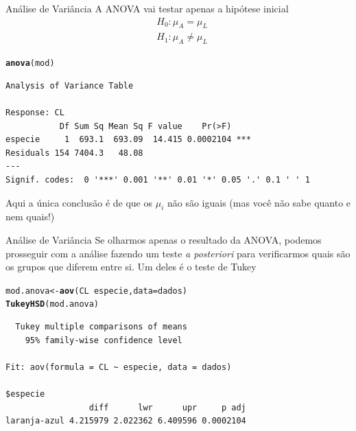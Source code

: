 \documentclass[10pt]{beamer}\usepackage[]{graphicx}\usepackage[]{color}
\makeatletter
\newcommand{\hlopt}[1]{\textcolor[rgb]{0,0,0}{#1}}%
\newcommand{\hlstd}[1]{\textcolor[rgb]{0.345,0.345,0.345}{#1}}%
\newcommand{\hlkwb}[1]{\textcolor[rgb]{0.69,0.353,0.396}{#1}}%
\newcommand{\hlkwc}[1]{\textcolor[rgb]{0.333,0.667,0.333}{#1}}%
\newcommand{\hlkwd}[1]{\textcolor[rgb]{0.737,0.353,0.396}{\textbf{#1}}}%
\newenvironment{kframe}{%
 \def\at@end@of@kframe{}%
 \ifinner\ifhmode%
  \def\at@end@of@kframe{\end{minipage}}%
  \begin{minipage}{\columnwidth}%
 \fi\fi%
 \def\FrameCommand##1{\hskip\@totalleftmargin \hskip-\fboxsep
 \colorbox{shadecolor}{##1}\hskip-\fboxsep
     \hskip-\linewidth \hskip-\@totalleftmargin \hskip\columnwidth}%
 \MakeFramed {\advance\hsize-\width
   \@totalleftmargin\z@ \linewidth\hsize
   \@setminipage}}%
 {\par\unskip\endMakeFramed%
 \at@end@of@kframe}
\newenvironment{knitrout}{}{} %
\theoremstyle{definition}
\makeatother
\begin{document}
\begin{frame}[fragile]{Análise de Variância}
A ANOVA vai testar apenas a hipótese inicial
\begin{align*}
  &H_0: \mu_A = \mu_L \\
  &H_1: \mu_A \neq \mu_L
\end{align*}
\begin{knitrout}\footnotesize
{}\color{fgcolor}\begin{kframe}
\begin{alltt}
\hlkwd{anova}\hlstd{(mod)}
\end{alltt}
\begin{verbatim}
Analysis of Variance Table

Response: CL
           Df Sum Sq Mean Sq F value    Pr(>F)    
especie     1  693.1  693.09  14.415 0.0002104 ***
Residuals 154 7404.3   48.08                      
---
Signif. codes:  0 '***' 0.001 '**' 0.01 '*' 0.05 '.' 0.1 ' ' 1
\end{verbatim}
\end{kframe}
\end{knitrout}
Aqui a única conclusão é de que os $\mu_i$ não são iguais (mas você
não sabe quanto e nem quais!)
\end{frame}

\begin{frame}[fragile]{Análise de Variância}
Se olharmos apenas o resultado da ANOVA, podemos prosseguir com a
análise fazendo um teste \textit{a posteriori} para verificarmos quais
são os grupos que diferem entre si. Um deles é o teste de Tukey
\begin{knitrout}\footnotesize
{}\color{fgcolor}\begin{kframe}
\begin{alltt}
\hlstd{mod.anova} \hlkwb{<-} \hlkwd{aov}\hlstd{(CL} \hlopt{~} \hlstd{especie,} \hlkwc{data} \hlstd{= dados)}
\hlkwd{TukeyHSD}\hlstd{(mod.anova)}
\end{alltt}
\begin{verbatim}
  Tukey multiple comparisons of means
    95% family-wise confidence level

Fit: aov(formula = CL ~ especie, data = dados)

$especie
                 diff      lwr      upr     p adj
laranja-azul 4.215979 2.022362 6.409596 0.0002104
\end{verbatim}
\end{kframe}
\end{knitrout}
\end{frame}
\end{document}
